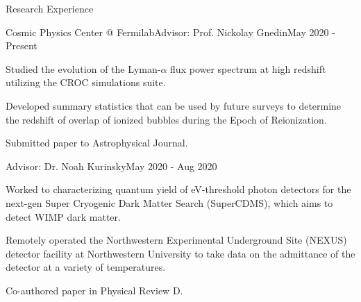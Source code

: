 \documentclass{resume} %
\begin{document}
\begin{rSection}{Research Experience}

\begin{rSubsection}{Cosmic Physics Center @ Fermilab}{}{Advisor: Prof. Nickolay Gnedin}{May 2020 - Present} \\
\item Studied the evolution of the Lyman-$\alpha$ flux power spectrum at high redshift utilizing the CROC simulations suite.
\item Developed summary statistics that can be used by future surveys to determine the redshift of overlap of ionized bubbles during the Epoch of Reionization.
\item Submitted paper to Astrophysical Journal.
\end{rSubsection}
\vspace{-.7cm}
\begin{rSubsection}{}{}{Advisor: Dr. Noah Kurinsky}{May 2020 - Aug 2020}

\item Worked to characterizing quantum yield of eV-threshold photon detectors for the next-gen Super Cryogenic Dark Matter Search (SuperCDMS), which aims to detect WIMP dark matter.
\item Remotely operated the Northwestern Experimental Underground Site (NEXUS) detector facility at Northwestern University to take data on the admittance of the detector at a variety of temperatures.
\item Co-authored paper in Physical Review D.
\end{rSubsection}


\end{rSection}
\end{document}
